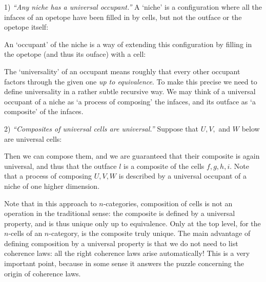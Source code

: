 1) {\it ``Any niche has a universal occupant.''}  A `niche' is
a configuration where all the infaces of an opetope have been filled in
by cells, but not the outface or the opetope itself:

\medskip
\centerline{\epsfysize=1.5in}
\medskip

\noindent An `occupant' of the niche is a way of extending this
configuration by filling in the opetope (and thus its ouface) with a
cell:

\medskip
\centerline{\epsfysize=1.5in}
\medskip

\noindent The `universality' of an occupant means roughly that every other
occupant factors through the given one {\it up to equivalence}.  To make
this precise we need to define universality in a rather subtle recursive
way.  We may think of a universal occupant of a niche as `a process of
composing' the infaces, and its outface as `a composite' of the infaces.

2) {\it ``Composites of universal cells are universal.''}  Suppose
that $U,V,$ and $W$ below are universal cells:

\medskip
\centerline{\epsfysize=1.5in}
\medskip

\noindent Then we can compose them, and we are guaranteed that their
composite is again universal, and thus that the outface $l$ is a composite
of the cells $f,g,h,i$.  Note that a process of composing $U,V,W$
is described by a universal occupant of a niche of one higher
dimension.  

Note that in this approach to $n$-categories, composition of cells is
not an operation in the traditional sense: the composite is defined by a
universal property, and is thus unique only up to equivalence.   Only at
the top level, for the $n$-cells of an $n$-category, is the composite
truly unique.  The main advantage of defining composition by a universal
property is that we do not need to list coherence laws: all the right
coherence laws arise automatically!    This is a very important point,
because in some sense it answers the puzzle concerning the origin of
coherence laws. 

